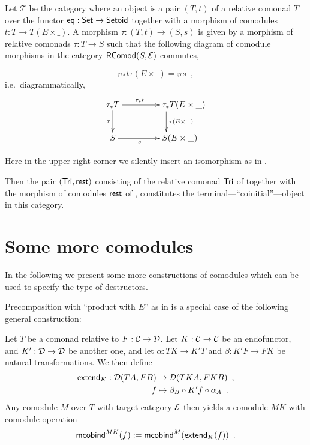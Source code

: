 \documentclass{amsart}
\begin{document}
\begin{theorem}\label{ex:final_sem_tri}
   Let $\mathcal{T}$ be the category where an object is a pair $(T,t)$ of a relative comonad $T$ over the functor
   $\eq: \Set \to \Setoid$ together with a morphism of comodules $t : T \to T(E \times \_)$.
   A morphism $\tau : (T,t) \to (S,s)$ is given by a morphism of relative comonads $\tau : T \to S$ such that
   the following diagram of comodule morphisms in the category $\RComod(S,\E)$ commutes,
   
   \[     \comp{\tau_*t}{\tau(E\times \_)} = \comp{\tau}{s} \enspace , \]
   i.e.\, diagrammatically,   
   \[ \begin{xy}
       \xymatrix{   \tau_*T  \ar[r]^{\tau_*t} \ar[d]_{\tau}  &  **[r] \tau_*T (E\times \_ )\ar[d]^{\tau(E\times \_)} \\
                    S  \ar[r]_{s}  &  **[r] S (E\times \_ )
        }
      \end{xy}
   \]

   \noindent
   Here in the upper right corner we silently insert an isomorphism as in .
   
   Then the pair $(\Tri, \tail)$ consisting of the relative comonad $\Tri$ of  together with 
    the morphism of comodules $\tail$ of ,
   constitutes the terminal---\enquote{coinitial}---object in this category.
   
\end{theorem}

\section{Some more comodules}

In the following we present some more constructions of comodules which can be used to specify the type of 
destructors.

Precomposition with \enquote{product with $E$} as in  is a special case of the following
general construction:

\begin{definition}
  Let $T$ be a comonad relative to $F:\C\to\D$. 
  Let $K : \C\to\C$ be an endofunctor, and $K' : \D\to\D$ be another one, and let 
  $\alpha : TK \to K'T$ and $\beta : K'F \to FK$ be natural transformations.
  We then define
  \begin{align*} \extend_K : \D(TA,FB) &\to \D(TKA,FKB)  \enspace , \\ 
                                  f  &\mapsto \comp{\alpha_{A}}{\comp{K'f}{\beta_B}}  \enspace .
  \end{align*}
%
  Any comodule $M$ over $T$ with target category $\E$ then yields a comodule $MK$ with comodule operation
  \[ \mcobind^{MK}(f) := \mcobind^M(\extend_K(f)) \enspace . \]
\end{definition}
\end{document}

